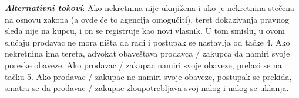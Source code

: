 \documentclass[20pt]{article}
\begin{document}
\begin{center}
\begin{tabular}{p{0.23\linewidth} p{0.77\linewidth}}
\end{tabular}
\end{center}

\textbf{\textit{Alternativni tokovi}}: Ako nekretnina nije uknji\v zena i ako je nekretnina ste\v cena na osnovu zakona (a ovde \' ce to agencija omogu\' citi), teret dokazivanja pravnog sleda nije na kupcu, i on se registruje kao novi vlasnik. U tom smislu, u ovom slu\v caju prodavac ne mora ni\v sta da radi i postupak se nastavlja od ta\v cke 4. Ako nekretnina ima tereta, advokat obave\v stava prodavca / zakupca da namiri svoje poreske obaveze. Ako prodavac / zakupac namiri svoje obaveze, prelazi se na ta\v cku 5. Ako prodavac / zakupac ne namiri svoje obaveze, postupak se prekida, smatra se da prodavac / zakupac zloupotrebljava svoj nalog i nalog se uklanja. \\
\end{document}
